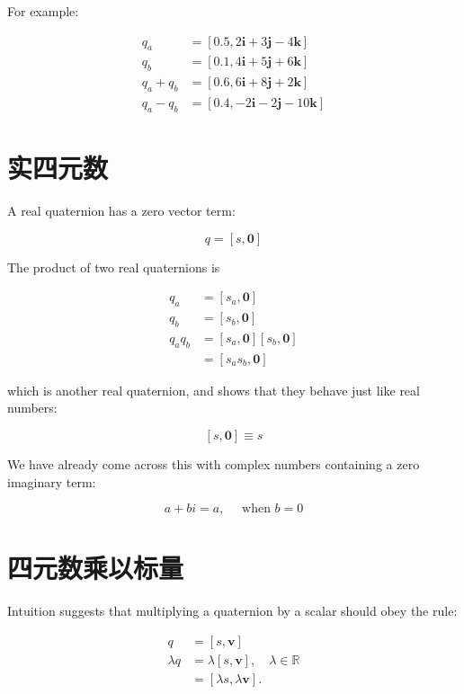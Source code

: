 For example:

$$
    \begin{aligned}
        q_{a}       & =[0.5,2 \mathbf{i}+3 \mathbf{j}-4 \mathbf{k}]   \\
        q_{b}       & =[0.1,4 \mathbf{i}+5 \mathbf{j}+6 \mathbf{k}]   \\
        q_{a}+q_{b} & =[0.6,6 \mathbf{i}+8 \mathbf{j}+2 \mathbf{k}]   \\
        q_{a}-q_{b} & =[0.4,-2 \mathbf{i}-2 \mathbf{j}-10 \mathbf{k}]
    \end{aligned}
$$

\section{实四元数}
A real quaternion has a zero vector term:

$$
    q=[s, \mathbf{0}]
$$

The product of two real quaternions is

$$
    \begin{aligned}
        q_{a}       & =\left[s_{a}, \mathbf{0}\right]                               \\
        q_{b}       & =\left[s_{b}, \mathbf{0}\right]                               \\
        q_{a} q_{b} & =\left[s_{a}, \mathbf{0}\right]\left[s_{b}, \mathbf{0}\right] \\
                    & =\left[s_{a} s_{b}, \mathbf{0}\right]
    \end{aligned}
$$

which is another real quaternion, and shows that they behave just like real numbers:

$$
    [s, \mathbf{0}] \equiv s
$$

We have already come across this with complex numbers containing a zero imaginary term:

$$
    a+b i=a, \quad \text { when } b=0
$$

\section{四元数乘以标量}
Intuition suggests that multiplying a quaternion by a scalar should obey the rule:

$$
    \begin{aligned}
        q         & =[s, \mathbf{v}]                                      \\
        \lambda q & =\lambda[s, \mathbf{v}], \quad \lambda \in \mathbb{R} \\
                  & =[\lambda s, \lambda \mathbf{v}] .
    \end{aligned}
$$

